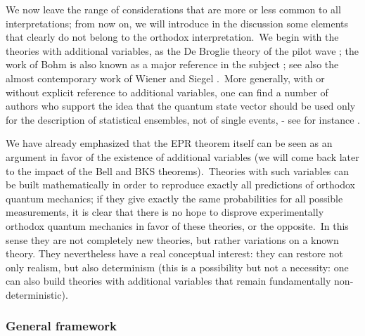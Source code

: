 \documentclass[12pt,onecolumn]{article}%
\begin{document}
We now leave the range of considerations that are more or less common to all
interpretations; from now on, we will introduce in the discussion some
elements that clearly do not belong to the orthodox interpretation.\ We begin
with the theories with additional variables, as the De Broglie theory of the
pilot wave \cite{De-Broglie}; the work of Bohm is also known as a major
reference in the subject \cite{Bohm} \cite{Bohm2}; see also the almost
contemporary work of Wiener and Siegel \cite{Wiener-Siegel}.\ More generally,
with or without explicit reference to additional variables, one can find a
number of authors who support the idea that the quantum state vector should be
used only for the description of statistical ensembles, not of single events,
- see for instance \cite{Ballentine} \cite{Pearle-3}.

We have already emphasized that the EPR theorem itself can be seen as an
argument in favor of the existence of additional variables (we will come back
later to the impact of the Bell and BKS theorems).\ Theories with such
variables can be built mathematically in order to reproduce exactly all
predictions of orthodox quantum mechanics; if they give exactly the same
probabilities for all possible measurements, it is clear that there is no hope
to disprove experimentally orthodox quantum mechanics in favor of these
theories, or the opposite.\ In this sense they are not completely new
theories, but rather variations on a known theory. They nevertheless have a
real conceptual interest: they can restore not only realism, but also
determinism (this is a possibility but not a necessity: one can also build
theories with additional variables that remain fundamentally non-deterministic).

\subsubsection{General framework}
\end{document}
